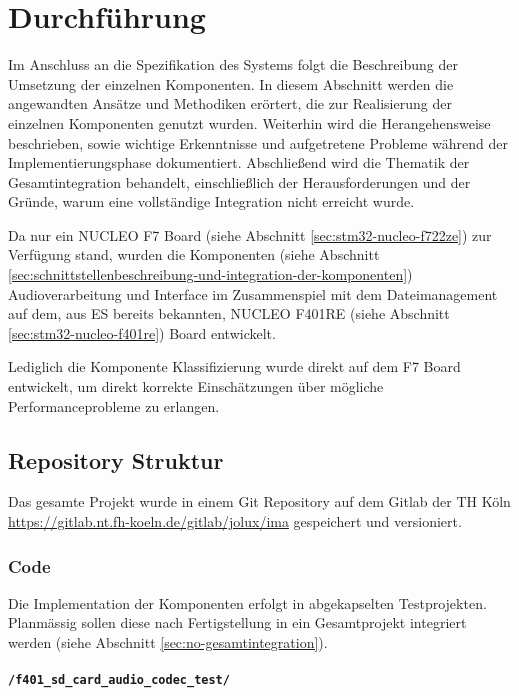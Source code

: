 \newpage
\section{Durchführung}
Im Anschluss an die Spezifikation des Systems folgt die Beschreibung der Umsetzung der einzelnen Komponenten. In diesem Abschnitt werden die angewandten Ansätze und Methodiken erörtert, die zur Realisierung der einzelnen Komponenten genutzt wurden. Weiterhin wird die Herangehensweise beschrieben, sowie wichtige Erkenntnisse und aufgetretene Probleme während der Implementierungsphase dokumentiert. Abschließend wird die Thematik der Gesamtintegration behandelt, einschließlich der Herausforderungen und der Gründe, warum eine vollständige Integration nicht erreicht wurde.

Da nur ein NUCLEO F7 Board (siehe Abschnitt \ref{sec:stm32-nucleo-f722ze}) zur Verfügung stand, wurden die Komponenten (siehe Abschnitt \ref{sec:schnittstellenbeschreibung-und-integration-der-komponenten}) Audioverarbeitung und Interface im Zusammenspiel mit dem Dateimanagement auf dem, aus ES bereits bekannten, NUCLEO F401RE (siehe Abschnitt \ref{sec:stm32-nucleo-f401re}) Board entwickelt.

Lediglich die Komponente Klassifizierung wurde direkt auf dem F7 Board entwickelt, um direkt korrekte Einschätzungen über mögliche Performanceprobleme zu erlangen.

\subsection{Repository Struktur}

Das gesamte Projekt wurde in einem Git Repository auf dem Gitlab der TH Köln \url{https://gitlab.nt.fh-koeln.de/gitlab/jolux/ima} gespeichert und versioniert.

\subsubsection{Code}

Die Implementation der Komponenten erfolgt in abgekapselten Testprojekten. 
Planmässig sollen diese nach Fertigstellung in ein Gesamtprojekt integriert werden (siehe Abschnitt \ref{sec:no-gesamtintegration}).

\paragraph{\texttt{/f401\_sd\_card\_audio\_codec\_test/}}

